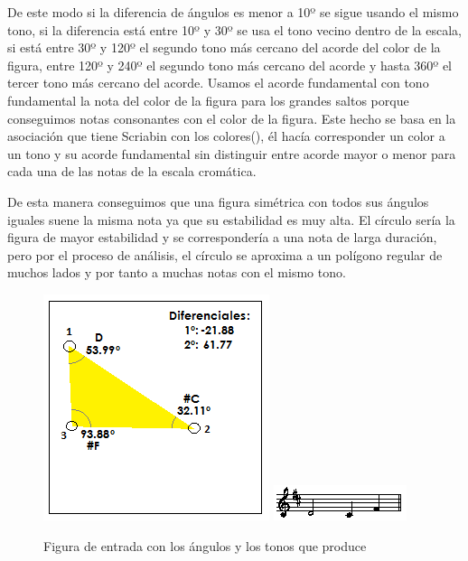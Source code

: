 De este modo si la diferencia de ángulos es menor a 10º se sigue usando el mismo tono, si la diferencia está entre 10º y 30º se usa el tono vecino dentro de la escala, si está entre 30º y 120º el segundo tono más cercano del acorde del color de la figura, entre 120º y 240º el segundo tono más cercano del acorde y hasta 360º el tercer tono más cercano del acorde. Usamos el acorde fundamental con tono fundamental la nota del color de la figura para los grandes saltos porque conseguimos notas consonantes con el color de la figura. Este hecho se basa en la asociación que tiene Scriabin con los colores(\cite{ScriabinQuintasColor}), él hacía corresponder un color a un tono y su acorde fundamental sin distinguir entre acorde mayor o menor para cada una de las notas de la escala cromática.

De esta manera conseguimos que una figura simétrica con todos sus ángulos iguales suene la misma nota ya que su estabilidad es muy alta. El círculo sería la figura de mayor estabilidad y se correspondería a una nota de larga duración, pero por el proceso de análisis, el círculo se aproxima a un polígono regular de muchos lados y por tanto a muchas notas con el mismo tono.

		\begin{figure}[htbp]
		\centering
		\hspace*{0.0in}
		\includegraphics[scale=1.0]{graphics/simpletest1-F3.png}
		\includegraphics[scale=1.0]{graphics/simpletest1-MELpartitura.png}
		\caption{Figura de entrada con los ángulos y los tonos que produce}
		\label{fig:Figura4Voz1}
		\end{figure}

